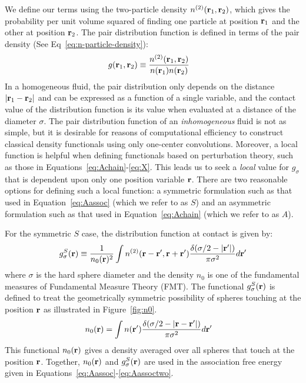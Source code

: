 We define our terms using the two-particle density
$n^{(2)}(\textbf{r}_1,\textbf{r}_2)$, which gives the probability per unit volume
squared of finding one particle at position $\textbf{r}_1$ and the other at
position $\textbf{r}_2$.  The pair distribution function is defined in terms
of the pair density (See Eq~\ref{eq:n-particle-density}):
\begin{align}
  g(\textbf{r}_1,\textbf{r}_2) &\equiv \frac{n^{(2)}(\textbf{r}_1,\textbf{r}_2)}{n(\textbf{r}_1)n(\textbf{r}_2)}
\end{align}
In a homogeneous fluid, the pair distribution only depends on the
distance $|\textbf{r}_1-\textbf{r}_2|$ and can be expressed as a function of a
single variable, and the contact value of the distribution function is
its value when evaluated at a distance of the diameter $\sigma$.  The
pair distribution function of an \emph{inhomogeneous} fluid is not as
simple, but it is desirable for reasons of computational efficiency to
construct classical density functionals using only one-center
convolutions.  Moreover, a local function is helpful when defining
functionals based on perturbation theory, such as those in
Equations~\ref{eq:Achain}-\ref{eq:X}.  This leads us to seek
a \emph{local} value for $g_\sigma$ that is dependent upon only one
position variable $\textbf{r}$.  There are two reasonable options for
defining such a local function: a symmetric formulation such as that
used in Equation~\ref{eq:Aassoc} (which we refer to as $S$) and an
asymmetric formulation such as that used in Equation~\ref{eq:Achain}
(which we refer to as $A$).

For the symmetric $S$ case, the distribution function at contact is
given by:
\begin{align}
  g^S_\sigma(\textbf{r}) \equiv \frac{1}{n_0(\textbf{r})^2}\int n^{(2)}(\textbf{r} - \textbf{r}', \textbf{r}
  + \textbf{r}')
  \frac{\delta(\sigma/2 -|\textbf{r}'|)}{\pi\sigma^2}d\textbf{r}' \label{eq:gS}
\end{align}
where $\sigma$ is the hard sphere diameter and the density $n_0$ is one of
the fundamental measures of Fundamental Measure Theory (FMT).  The
functional $g^S_\sigma(\textbf{r})$ is defined to treat the geometrically
symmetric possibility of spheres touching at the position $\textbf{r}$ as
illustrated in Figure~\ref{fig:n0}.
\begin{align}
  n_0(\textbf{r}) &= \int n(\textbf{r}')\frac{\delta(\sigma/2 -|\textbf{r}-\textbf{r}'|)}{\pi\sigma^2} d\textbf{r}'
  \label{eq:n0}
\end{align}
This functional $n_0(\textbf{r})$ gives a density averaged over all spheres
that touch at the position $\textbf{r}$.  Together, $n_0(\textbf{r})$ and
$g_\sigma^S(\textbf{r})$ are used in the association free energy given in
Equations~\ref{eq:Aassoc}-\ref{eq:Aassoctwo}.

